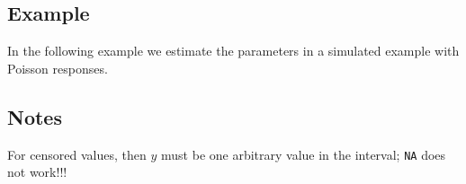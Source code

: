 \documentclass[a4paper,11pt]{article}
\begin{document}
\subsection*{Example}

In the following example we estimate the parameters in a simulated
example with Poisson responses.
{\small

}

\subsection*{Notes}

For censored values, then $y$ must be one arbitrary value in the interval; \texttt{NA} does not work!!!
\end{document}
